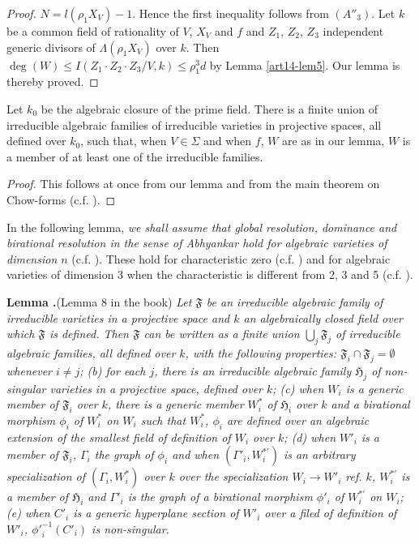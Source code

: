 \begin{proof}
$N=l(\rho_{1}X_{V})-1$. Hence the first inequality follows from $(A''_{3})$. Let $k$ be a common field of rationality of $V$, $X_{V}$ and $f$ and $Z_{1}$, $Z_{2}$, $Z_{3}$ independent generic divisors of $\Lambda(\rho_{1}X_{V})$ over $k$. Then $\deg(W)\leq I(Z_{1}\cdot Z_{2}\cdot Z_{3}/V,k)\leq \rho^{3}_{1}d$ by Lemma \ref{art14-lem5}. Our lemma is thereby proved.
\end{proof}

\begin{coro*}
Let $k_{0}$ be the algebraic closure of the prime field. There is a finite union of irreducible algebraic families of irreducible varieties in projective spaces, all defined over $k_{0}$, such that, when $V\in \Sigma$ and when $f$, $W$ are as in our lemma, $W$ is a member of at least one of the irreducible families.
\end{coro*}

\begin{proof}
This follows at once from our lemma and from the main theorem on Chow-forms (c.f. \cite{art14-key3}).
\end{proof}

In the following lemma, {\em we shall assume that global resolution, dominance and birational resolution in the sense of Abhyankar hold for algebraic varieties of dimension $n$} (c.f. \cite{art14-key35}). These hold for characteristic zero (c.f. \cite{art14-key5}) and for algebraic varieties of dimension 3 when the characteristic is different from 2, 3 and 5 (c.f. \cite{art14-key35}).

\medskip
\noindent
{\bf Lemma .\label{art14-lem9}}(Lemma 8 in the book)
{\em Let $\mathfrak{F}$ be an irreducible algebraic family of irreducible varieties in a projective space and $k$ an algebraically closed field over which $\mathfrak{F}$ is defined. Then $\mathfrak{F}$ can be written as a finite union $\bigcup_{j}\mathfrak{F}_{j}$ of irreducible algebraic families, all defined over $k$, with the following properties: $\mathfrak{F}_{i}\cap \mathfrak{F}_{j}=\emptyset$ whenever $i\neq j$; {\rm(b)} for each $j$, there is an irreducible algebraic family $\mathfrak{H}_{j}$ of non-singular varieties in a projective space, defined over $k$; {\rm(c)} when $W_{i}$ is a generic member of $\mathfrak{F}_{i}$ over $k$, there is a generic member $W^{*}_{i}$ of $\mathfrak{H}_{i}$ over $k$ and a birational morphism $\phi_{i}$ of $W^{*}_{i}$ on $W_{i}$ such that $W^{*}_{i}$, $\phi_{i}$ are defined over an algebraic extension of the smallest field of definition of $W_{i}$ over $k$; {\rm(d)} when $W'_{i}$ is a member of $\mathfrak{F}_{i}$, $\Gamma_{i}$ the graph of $\phi_{i}$ and when $(\Gamma'_{i},W^{*'}_{i})$ is an arbitrary specialization of $(\Gamma_{i},W^{*}_{i})$ over $k$ over the specialization $W_{i}\to W'_{i}$ ref. $k$, $W^{*'}_{i}$ is a member of $\mathfrak{H}_{i}$ and $\Gamma'_{i}$ is the graph of a birational morphism $\phi'_{i}$ of $W^{*'}_{i}$ on $W_{i}$; {\rm(e)} when $C'_{i}$ is a generic hyperplane section of $W'_{i}$ over a filed of definition of $W'_{i}$, ${\phi'}^{-1}_{i}(C'_{i})$ is non-singular.}

